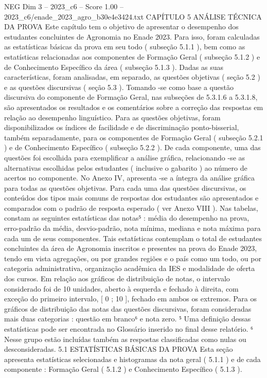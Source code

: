 \begin{textsample}{NEG Dim 3 – 2023\_c6 – Score 1.00 – 2023\_c6/enade\_2023\_agro\_b30e4e3424.txt}  \label{ex:f3_neg_179}
CAPÍTULO 5 ANÁLISE TÉCNICA DA PROVA Este capítulo tem o objetivo de apresentar o desempenho dos estudantes concluintes de Agronomia no Enade 2023.
Para isso, foram calculadas as estatísticas básicas da prova em seu todo ( subseção 5.1.1 ), bem como as estatísticas relacionadas aos componentes de Formação Geral ( subseção 5.1.2 ) e de Conhecimento Específico da área ( subseção 5.1.3 ).
Dadas as suas características, foram analisadas, em separado, as questões objetivas ( seção 5.2 ) e as questões discursivas ( seção 5.3 ).
Tomando -se como base a questão discursiva do componente de Formação Geral, nas subseções de 5.3.1.6 a 5.3.1.8, são apresentados os resultados e os comentários sobre a correção das respostas em relação ao desempenho linguístico.
Para as questões objetivas, foram disponibilizados os índices de facilidade e de discriminação ponto-bisserial, também separadamente, para os componentes de Formação Geral ( subseção 5.2.1 ) e de Conhecimento Específico ( subseção 5.2.2 ).
De cada componente, uma das questões foi escolhida para exemplificar a análise gráfica, relacionando -se as alternativas escolhidas pelos estudantes ( inclusive o gabarito ) ao número de acertos no componente.
No Anexo IV, apresenta -se a íntegra da análise gráfica para todas as questões objetivas.
Para cada uma das questões discursivas, os conteúdos dos tipos mais comuns de respostas dos estudantes são apresentados e comparados com o padrão de resposta esperado ( ver Anexo VIII ).
Nas tabelas, constam as seguintes estatísticas das notas⁵ : média do desempenho na prova, erro-padrão da média, desvio-padrão, nota mínima, mediana e nota máxima para cada um de seus componentes.
Tais estatísticas contemplam o total de estudantes concluintes da área de Agronomia inscritos e presentes na prova do Enade 2023, tendo em vista agregações, ou por grandes regiões e o país como um todo, ou por categoria administrativa, organização acadêmica da IES e modalidade de oferta dos cursos.
Em relação aos gráficos de distribuição de notas, o intervalo considerado foi de 10 unidades, aberto à esquerda e fechado à direita, com exceção do primeiro intervalo, [ 0 ; 10 ], fechado em ambos os extremos.
Para os gráficos de distribuição das notas das questões discursivas, foram consideradas mais duas categorias : questão em branco⁶ e nota zero. ⁵ Uma definição dessas estatísticas pode ser encontrada no Glossário inserido no final desse relatório. ⁶ Nesse grupo estão incluídas também as respostas classificadas como nulas ou desconsideradas. 5.1 ESTATÍSTICAS BÁSICAS DA PROVA Esta seção apresenta estatísticas selecionadas e histogramas da nota geral ( 5.1.1 ) e de cada componente : Formação Geral ( 5.1.2 ) e Conhecimento Específico ( 5.1.3 ).

\end{textsample}
